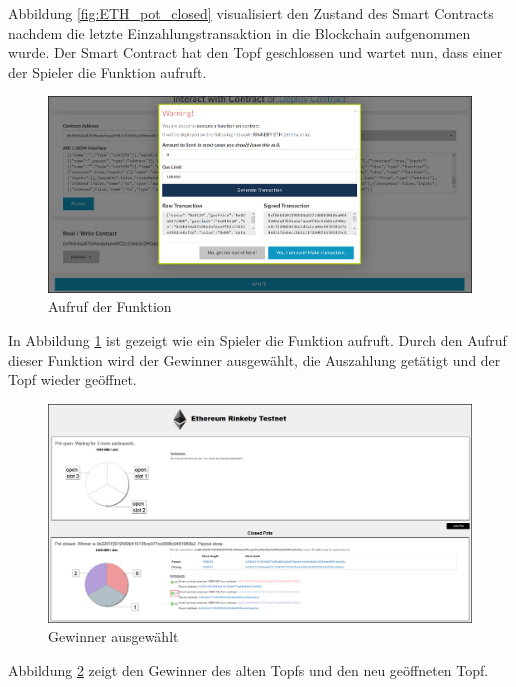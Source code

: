 Abbildung \ref{fig:ETH_pot_closed} visualisiert den Zustand des Smart Contracts nachdem die letzte Einzahlungstransaktion in die Blockchain aufgenommen wurde. Der Smart Contract hat den Topf geschlossen und wartet nun, dass einer der Spieler die  Funktion aufruft.

\begin{figure}[H]
\centering
\includegraphics[width=1\linewidth]{Figures/eth_gui/ETH_wallet_payout}
\decoRule
\caption{Aufruf der  Funktion}
\label{fig:ETH_wallet_payout}
\end{figure}

In Abbildung \ref{fig:ETH_wallet_payout} ist gezeigt wie ein Spieler die   Funktion aufruft. Durch den Aufruf dieser Funktion wird der Gewinner ausgewählt, die Auszahlung getätigt und der Topf wieder geöffnet.

\begin{figure}[H]
\centering
\includegraphics[width=1\linewidth]{Figures/eth_gui/ETH_pot_finished}
\decoRule
\caption{Gewinner ausgewählt}
\label{fig:ETH_pot_finished}
\end{figure}

Abbildung \ref{fig:ETH_pot_finished} zeigt den Gewinner des alten Topfs und den neu geöffneten Topf.

